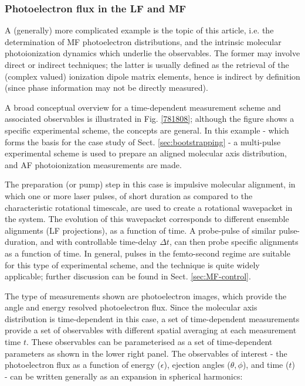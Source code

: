 \documentclass[10pt]{article}
\begin{document}
\subsubsection{Photoelectron flux in the LF and MF\label{sec:flux-intro}}

A (generally) more complicated example is the topic of this article, i.e. the determination of MF photoelectron distributions, and the intrinsic molecular photoionization dynamics which underlie the observables.  The former may involve direct or indirect techniques; the latter is usually defined as the retrieval of the (complex valued) ionization dipole matrix elements, hence is indirect by definition (since phase information may not be directly measured). 

A broad conceptual overview for a time-dependent measurement scheme and associated observables is illustrated in Fig. \ref{781808}; although the figure shows a specific experimental scheme, the concepts are general. In this example - which forms the basis for the case study of Sect. \ref{sec:bootstrapping} - a multi-pulse experimental scheme is used to prepare an aligned molecular axis distribution, and AF photoionization measurements are made.

The preparation (or pump) step in this case is impulsive molecular alignment, in which one or more laser pulses, of short duration as compared to
the characteristic rotational timescale, are used to create a rotational wavepacket in the system. The evolution of this wavepacket corresponds to different ensemble alignments (LF projections), as a function of time. A probe-pulse of similar pulse-duration, and with controllable time-delay $\Delta t$, can then probe specific alignments as a function of time. In general, pulses in the femto-second regime are suitable for this type of experimental scheme, and the technique is quite widely applicable; further discussion can be found in Sect. \ref{sec:MF-control}.

The type of measurements shown are photoelectron images, which provide the angle and energy resolved photoelectron flux. Since the molecular axis distribution is time-dependent in this case,
a set of time-dependent measurements provide a set of observables with different spatial averaging at each measurement time $t$. These observables can be parameterised as a set of time-dependent parameters as shown in the lower right panel. The observables of interest - the photoelectron flux as a function of energy ($\epsilon$), ejection angles ($\theta,\phi$), and time ($t$) - can be written generally as an expansion in spherical harmonics:
\end{document}
